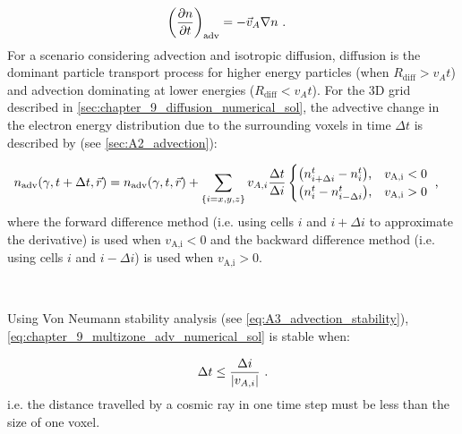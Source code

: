 \begin{equation}
    \begin{aligned}
    \qty(\pdv{n}{t})_\text{adv}&=-\vec{v}_A\nabla n\text{ .} 
    \end{aligned} \label{eq:chapter_9_advection_component}
\end{equation}
\noindent For a scenario considering advection and isotropic diffusion, diffusion is the dominant particle transport process for higher energy particles (when $R_\text{diff}>v_At$) and advection dominating at lower energies ($R_\text{diff}<v_At$). For the 3D grid described in \autoref{sec:chapter_9_diffusion_numerical_sol}, the advective change in the electron energy distribution due to the surrounding voxels in time $\Delta t$ is described by (see \autoref{sec:A2_advection}):

\begin{equation}
    \begin{aligned}
        n_\text{adv}\qty(\gamma,t+\Delta t,\vec{r})&=n_\text{adv}\qty(\gamma,t,\vec{r})+\sum_\qty{i=x,y,z}v_{A,i}\frac{\Delta t}{\Delta i}
        \begin{cases}
            \qty(n_{i+\Delta i}^t-n_{i}^t)\text{,}& v_\text{A,i}<0 \\
            \qty(n_{i}^t-n_{i-\Delta i}^t)\text{,}& v_\text{A,i}>0
        \end{cases} \text{ ,}
    \end{aligned} \label{eq:chapter_9_multizone_adv_numerical_sol}
\end{equation}
\noindent where the forward difference method (i.e. using cells $i$ and $i+\Delta i$ to approximate the derivative) is used when $v_\text{A,i}<0$ and the backward difference method (i.e. using cells $i$ and $i-\Delta i$) is used when $v_\text{A,i}>0$. 
\par~\par 
Using Von Neumann stability analysis (see \autoref{eq:A3_advection_stability}), \autoref{eq:chapter_9_multizone_adv_numerical_sol} is stable when:

\begin{equation}
    \begin{aligned}
    \Delta t \leq \frac{\Delta i}{\abs{v_{A,i}}}\text{ .} 
    \end{aligned} \label{eq:09_multizone_advection_stability}
\end{equation}
\noindent i.e. the distance travelled by a cosmic ray in one time step must be less than the size of one voxel.

